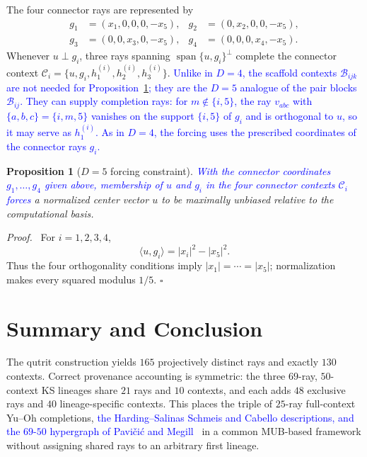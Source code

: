 \documentclass[%
  reprint,
  superscriptaddress,
  showkeys,
  amsmath,amssymb,
  aps,pra,
  longbibliography,
  floatfix,
  x11names
]{revtex4-2}
\DeclareRobustCommand{\chg}[1]{\textcolor{blue}{#1}}
\newtheorem{proposition}{Proposition}
\newenvironment{proof}{\par\noindent\textit{Proof.}\ }{\hfill$\square$\par}
\begin{document}
The four connector rays are represented by
\begin{align*}
g_1&=(x_1,0,0,0,-x_5),&
g_2&=(0,x_2,0,0,-x_5),\\
g_3&=(0,0,x_3,0,-x_5),&
g_4&=(0,0,0,x_4,-x_5).
\end{align*}
Whenever $u\perp g_i$, three rays spanning $\operatorname{span}\{u,g_i\}^{\perp}$ complete the connector context $\mathcal{C}_i=\{u,g_i,h^{(i)}_1,h^{(i)}_2,h^{(i)}_3\}$.
\chg{Unlike in $D=4$, the scaffold contexts $\mathcal{B}_{ijk}$ are not needed for Proposition~\ref{prop:D5forcing}; they are the $D=5$ analogue of the pair blocks $\mathcal{B}_{ij}$.  They can supply completion rays: for $m\notin\{i,5\}$, the ray $v_{abc}$ with $\{a,b,c\}=\{i,m,5\}$ vanishes on the support $\{i,5\}$ of $g_i$ and is orthogonal to $u$, so it may serve as $h^{(i)}_1$.  As in $D=4$, the forcing uses the prescribed coordinates of the connector rays $g_i$.}

\begin{proposition}[$D=5$ forcing constraint]
\label{prop:D5forcing}
\chg{With the connector coordinates $g_1,\ldots,g_4$ given above, membership of $u$ and $g_i$ in the four connector contexts $\mathcal{C}_i$ forces} a normalized center vector $u$ to be maximally unbiased relative to the computational basis.
\end{proposition}

\begin{proof}
For $i=1,2,3,4$,
\[
\langle u,g_i\rangle=|x_i|^2-|x_5|^2.
\]
Thus the four orthogonality conditions imply \ensuremath{|x_1|=\cdots=|x_5|};
normalization makes every squared modulus $1/5$.
\end{proof}

\section{Summary and Conclusion}


The qutrit construction yields $165$ projectively distinct rays and exactly $130$ contexts.  Correct provenance accounting is symmetric: the three $69$-ray, $50$-context KS lineages share $21$ rays and $10$ contexts, and each adds $48$ exclusive rays and $40$ lineage-specific contexts.  This places the triple of $25$-ray full-context Yu--Oh completions, \chg{the Harding--Salinas Schmeis and Cabello descriptions, and the $69$-$50$ hypergraph of Pavi\v{c}i\'{c} and Megill~\cite{pavicic-megill-2022,Pavicic_2023}} in a common MUB-based framework without assigning shared rays to an arbitrary first lineage.
\end{document}
